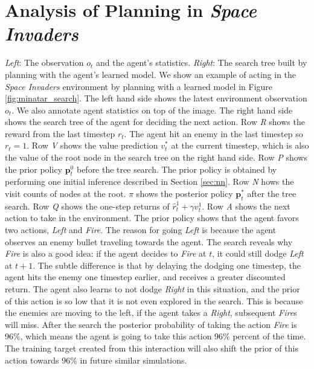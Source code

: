 \section{Analysis of Planning in \textit{Space Invaders}}
{
    \textit{Left}: The observation \(o_t\) and the agent's statistics.
    \textit{Right}: The search tree built by planning with the agent's learned model.
}
We show an example of \moozi acting in the \textit{Space Invaders} environment by planning with a learned model in Figure \ref{fig:minatar_search}.
The left hand side shows the latest environment observation $o_t$.
We also annotate agent statistics on top of the image.
The right hand side shows the search tree of the agent for deciding the next action.
Row \textit{R} shows the reward from the last timestep $r_t$.
The agent hit an enemy in the last timestep so $r_t = 1$.
Row \textit{V} shows the value prediction $v_t^{*}$ at the current timestep, which is also the value of the root node in the search tree on the right hand side.
Row \textit{P} shows the prior policy $\mathbf{p}^0_t$ before the tree search.
The prior policy is obtained by performing one initial inference described in Section \ref{sec:nn}.
Row \textit{N} hows the visit counts of nodes at the root.
\(\pi\) shows the posterior policy $\mathbf{p}^*_t$ after the tree search.
Row \textit{Q} shows the one-step returns of  \(\hat{r}_t^1 + \gamma v_t^1\).
Row \textit{A} shows the next action to take in the environment.
The prior policy shows that the agent favors two actions, \textit{Left} and \textit{Fire}.
The reason for going \textit{Left} is because the agent observes an enemy bullet traveling towards the agent.
The search reveals why \textit{Fire} is also a good idea: if the agent decides to \textit{Fire} at $t$, it could still dodge \textit{Left} at $t+1$.
The subtle difference is that by delaying the dodging one timestep, the agent hits the enemy one timestep earlier, and receives a greater discounted return.
The agent also learns to not dodge \textit{Right} in this situation, and the prior of this action is so low that it is not even explored in the search.
This is because the enemies are moving to the left, if the agent takes a \textit{Right}, subsequent \textit{Fire}s will miss.
After the search the posterior probability of taking the action \textit{Fire} is 96\%, which means the agent is going to take this action 96\% percent of the time.
The training target created from this interaction will also shift the prior of this action towards 96\% in future similar simulations.


